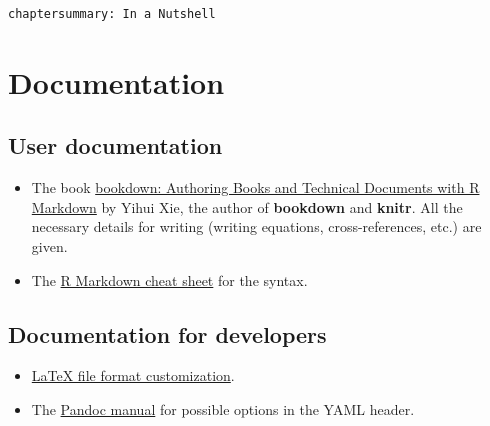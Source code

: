 \documentclass[
  12pt,
  american,
  a4paper,
  extrafontsizes,onecolumn,openright
  ]{memoir}
\makeatletter
\providecommand{\tightlist}{%
  \setlength{\itemsep}{0pt}\setlength{\parskip}{0pt}}
\newcommand{\MemoirChapStyle}{daleif1}
\newcommand{\MemoirPageStyle}{Ruled}
\newlength\widthw %
\newcommand*{\SmallMargins}{
  \setlrmarginsandblock{1.5in}{1.5in}{*}
  \setmarginnotes{0.1in}{0.1in}{0.1in}
 \setulmarginsandblock{1.5in}{1in}{*}
  \checkandfixthelayout
  \ch@ngetext
  \clearpage
  \setlength{\widthw}{\textwidth+\marginparsep+\marginparwidth}
  \footnotesatfoot
  \chapterstyle{\MemoirChapStyle}  %
  \pagestyle{\MemoirPageStyle}
}
\makeatother
\begin{document}
\begin{verbatim}
chaptersummary: In a Nutshell
\end{verbatim}

\hypertarget{documentation}{%
\section{Documentation}\label{documentation}}

\hypertarget{user-documentation}{%
\subsection{User documentation}\label{user-documentation}}

\begin{itemize}
\tightlist
\item
  The book \href{https://bookdown.org/yihui/bookdown/}{bookdown: Authoring Books and Technical Documents with R Markdown} by Yihui Xie, the author of \textbf{bookdown} and \textbf{knitr}.
  All the necessary details for writing (writing equations, cross-references, etc.) are given.
\item
  The \href{https://www.rstudio.com/wp-content/uploads/2015/02/rmarkdown-cheatsheet.pdf}{R Markdown cheat sheet} for the syntax.
\end{itemize}

\hypertarget{documentation-for-developers}{%
\subsection{Documentation for developers}\label{documentation-for-developers}}

\begin{itemize}
\tightlist
\item
  \href{http://rmarkdown.rstudio.com/pdf_document_format.html\#advanced_customization}{LaTeX file format customization}.
\item
  The \href{https://pandoc.org/MANUAL.html}{Pandoc manual} for possible options in the YAML header.
\end{itemize}



\backmatter
\SmallMargins

\printbibliography
\onecolumn


\end{document}
